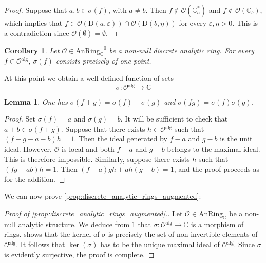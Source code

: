 \documentclass[12pt,a4paper,reqno]{amsart}
\theoremstyle{plain}
\newtheorem{lem}[thm]{Lemma}
\newtheorem{cor}[thm]{Corollary}
\theoremstyle{definition}
\theoremstyle{remark}
\numberwithin{equation}{section}
\begin{document}
\begin{proof}
	Suppose that $a,b \in \sigma(f)$, with $a \ne b$.
	Then $f \not \in {\mathcal O}(\mathbb C^*_a)$ and $f \not \in {\mathcal O}(\mathbb C_b)$, which implies that $f \in {\mathcal O}(\mathrm D(a, \varepsilon)) \cap {\mathcal O}(\mathrm D(b, \eta))$ for every $\varepsilon, \eta > 0$. This is a contradiction since ${\mathcal O}(\emptyset) = \emptyset$.
\end{proof}

\begin{cor}
	Let ${\mathcal O} \in {\mathrm{AnRing}_{\mathbb C}}^0$ be a non-null discrete analytic ring. For every $f \in {\mathcal O}{^\mathrm{alg}}$, $\sigma(f)$ consists precisely of one point.
\end{cor}

At this point we obtain a well defined function of sets
\[ \sigma \colon {\mathcal O}{^\mathrm{alg}} \to \mathbb C \]

\begin{lem} \label{lem:sigma_morphism_of_rings}
	One has $\sigma(f + g) = \sigma(f) + \sigma(g)$ and $\sigma(fg) = \sigma(f) \sigma(g)$.
\end{lem}

\begin{proof}
	Set $\sigma(f) = a$ and $\sigma(g) = b$. It will be sufficient to check that $a + b \in \sigma(f + g)$.
	Suppose that there exists $h \in {\mathcal O}{^\mathrm{alg}}$ such that $(f + g - a - b)h = 1$. Then the ideal generated by $f - a$ and $g -b$ is the unit ideal.
	However, ${\mathcal O}$ is local and both $f - a$ and $g - b$ belongs to the maximal ideal. This is therefore impossible.
	Similarly, suppose there exists $h$ such that $(fg - ab) h = 1$. Then $(f-a)gh + ah(g-b) = 1$, and the proof proceeds as for the addition.
\end{proof}

We can now prove \cref{prop:discrete_analytic_rings_augmented}:

\begin{proof}[Proof of \cref{prop:discrete_analytic_rings_augmented}.]
	Let ${\mathcal O} \in {\mathrm{AnRing}_{\mathbb C}}$ be a non-null analytic structure.
	We deduce from \cref{lem:sigma_morphism_of_rings} that $\sigma \colon {\mathcal O}{^\mathrm{alg}} \to \mathbb C$ is a morphism of rings.
	 shows that the kernel of $\sigma$ is precisely the set of non invertible elements of ${\mathcal O}{^\mathrm{alg}}$.
	It follows that $\ker(\sigma)$ has to be the unique maximal ideal of ${\mathcal O}{^\mathrm{alg}}$. Since $\sigma$ is evidently surjective, the proof is complete.
\end{proof}
\end{document}
